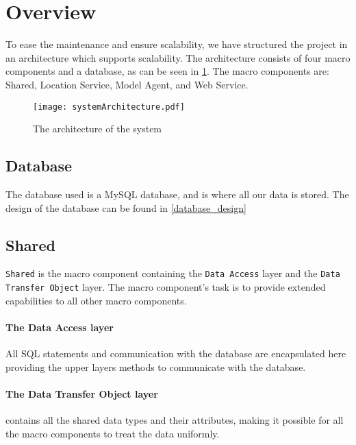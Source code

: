 \section{Overview}
To ease the maintenance and ensure scalability, we have structured the project in an architecture which supports scalability.
The architecture consists of four macro components and a database, as can be seen in \cref{fig:architecture}. The macro components are: Shared, Location Service, Model Agent, and Web Service.

%

\begin{figure}[H]
\texttt{[image: systemArchitecture.pdf]}
\caption{The architecture of the system}
\label{fig:architecture}
\end{figure}

\subsection*{Database} The database used is a MySQL database, and is where all our data is stored.
The design of the database can be found in \cref{database_design}


\subsection*{Shared}\texttt{Shared} is the macro component containing the \texttt{Data Access} layer and the \texttt{Data Transfer Object} layer.
The macro component's task is to provide extended capabilities to all other macro components.

\paragraph{The Data Access layer} All SQL statements and communication with the database are encapsulated here providing the upper layers methods to communicate with the database.

\paragraph{The Data Transfer Object layer} contains all the shared data types and their attributes, making it possible for all the macro components to treat the data uniformly.

